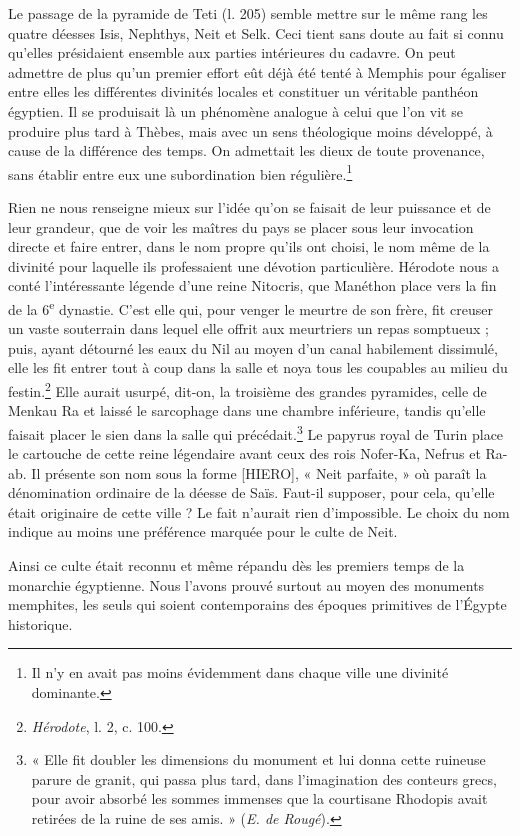 \documentclass[a4paper, 11pt, oneside]{article}
\begin{document}
Le passage de la pyramide de Teti (l. 205) semble mettre sur le même rang les quatre déesses Isis, Nephthys, Neit et Selk. Ceci tient sans doute au fait si connu qu'elles présidaient ensemble aux parties intérieures du cadavre. On peut admettre de plus qu'un premier effort eût déjà été tenté à Memphis pour égaliser entre elles les différentes divinités locales et constituer un véritable panthéon égyptien. Il se produisait là un phénomène analogue à celui que l'on vit se produire plus tard à Thèbes, mais avec un sens théologique moins développé, à cause de la différence des temps. On admettait les dieux de toute provenance, sans établir entre eux une subordination bien régulière.\footnote{Il n'y en avait pas moins évidemment dans chaque ville une divinité dominante.}

Rien ne nous renseigne mieux sur l'idée qu'on se faisait de leur puissance et de leur grandeur, que de voir les maîtres du pays se placer sous leur invocation directe et faire entrer, dans le nom propre qu'ils ont choisi, le nom même de la divinité pour laquelle ils professaient une dévotion particulière. Hérodote nous a conté l'intéressante légende d'une reine Nitocris, que Manéthon place vers la fin de la 6\textsuperscript{e} dynastie. C'est elle qui, pour venger le meurtre de son frère, fit creuser un vaste souterrain dans lequel elle offrit aux meurtriers un repas somptueux ; puis, ayant détourné les eaux du Nil au moyen d'un canal habilement dissimulé, elle les fit entrer tout à coup dans la salle et noya tous les coupables au milieu du festin.\footnote{\emph{Hérodote}, l. 2, c. 100.} Elle aurait usurpé, dit-on, la troisième des grandes pyramides, celle de Menkau Ra et laissé le sarcophage dans une chambre inférieure, tandis qu’elle faisait placer le sien dans la salle qui précédait.\footnote{« Elle fit doubler les dimensions du monument et lui donna cette ruineuse parure de granit, qui passa plus tard, dans l'imagination des conteurs grecs, pour avoir absorbé les sommes immenses que la courtisane Rhodopis avait retirées de la ruine de ses amis. » (\emph{E. de Rougé}).} Le papyrus royal de Turin place le cartouche de cette reine légendaire avant ceux des rois Nofer-Ka, Nefrus et Ra-ab. Il présente son nom sous la forme [HIERO], « Neit parfaite, » où paraît la dénomination ordinaire de la déesse de Saïs. Faut-il supposer, pour cela, qu'elle était originaire de cette ville ? Le fait n'aurait rien d'impossible. Le choix du nom indique au moins une préférence marquée pour le culte de Neit.

Ainsi ce culte était reconnu et même répandu dès les premiers temps de la monarchie égyptienne. Nous l'avons prouvé surtout au moyen des monuments memphites, les seuls qui soient contemporains des époques primitives de l'Égypte historique.
\end{document}
